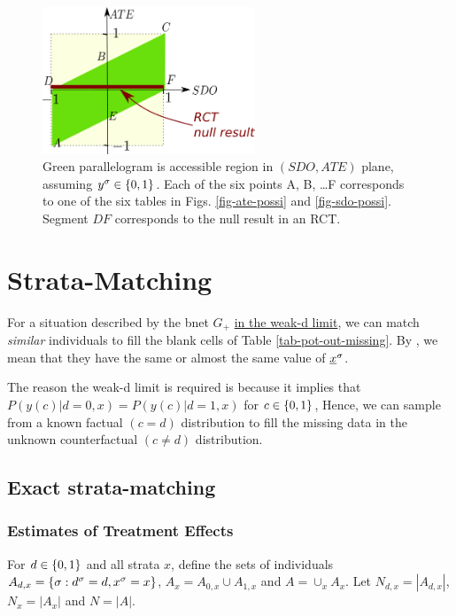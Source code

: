 \begin{figure}[h!]
\centering
\includegraphics[width=2.5in]
{pot-out/sdo-ate-polytope.png}
\caption{
Green parallelogram
is accessible region in
$(SDO,ATE)$ plane,
assuming $y^\sigma\in \{0,1\}$.
Each of the
six points A, B, \ldots F
corresponds to one of the six tables
in Figs. \ref{fig-ate-possi}
and \ref{fig-sdo-possi}.
Segment $DF$
corresponds to the null
result in an RCT.
}
\label{fig-sdo-ate-polytope}
\end{figure}



\section{Strata-Matching}
\label{sec-strata-matching}

For a situation
described by
the bnet $G_{+}$
\ul{ in the weak-d limit},
we can match {\it similar}
individuals to fill the blank cells of
 Table \ref{tab-pot-out-missing}.
By , we mean that
they have the same or almost the same
value of $\rvx^\s$.

The reason the weak-d limit
is required is because
it implies that $P(y(c)|d=0,x)=
P(y(c)|d=1,x)$ for $c\in \{0,1\}$,
Hence, we can sample from a
known factual $(c=d)$
distribution to
fill  the missing data
in the unknown counterfactual $(c\neq d)$
distribution.





\subsection{Exact   strata-matching}

\subsubsection{Estimates of Treatment Effects}
\label{sec-estimates}
For $ d\in \{0,1\}$ and all strata $x$,
define the sets of individuals
$A_{ d,x}=\{\sigma:  d^\sigma= d, x^\sigma=x\}$,
$A_x=A_{0,x}\cup A_{1,x}$ and $A=\cup_x A_x$.
Let $N_{ d,x}=|A_{ d,x}|$,
$N_x= |A_x|$ and $N=|A|$.

